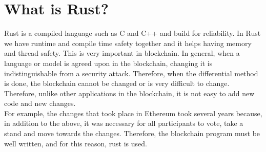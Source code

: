 \section{What is Rust?}
Rust is a compiled language such as C and C++ and build for reliability. In Rust we have runtime and compile time safety together and it helps having memory and thread safety. This is very important in blockchain. In general, when a language or model is agreed upon in the blockchain, changing it is indistinguishable from a security attack. Therefore, when the differential method is done, the blockchain cannot be changed or is very difficult to change. Therefore, unlike other applications in the blockchain, it is not easy to add new code and new changes.\\ For example, the changes that took place in Ethereum took several years because, in addition to the above, it was necessary for all participants to vote, take a stand and move towards the changes. Therefore, the blockchain program must be well written, and for this reason, rust is used.
